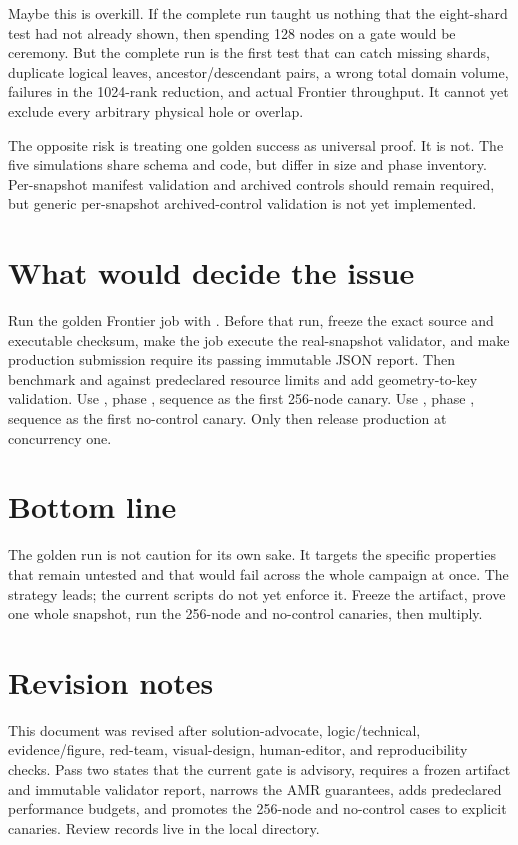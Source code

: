 \documentclass[11pt]{article}
\begin{document}
Maybe this is overkill. If the complete run taught us nothing that the
eight-shard test had not already shown, then spending 128 nodes on a gate would
be ceremony. But the complete run is the first test that can catch missing
shards, duplicate logical leaves, ancestor/descendant pairs, a wrong total
domain volume, failures in the 1024-rank reduction, and actual Frontier
throughput. It cannot yet exclude every arbitrary physical hole or overlap.

The opposite risk is treating one golden success as universal proof. It is not.
The five simulations share schema and code, but differ in size and phase
inventory. Per-snapshot manifest validation and archived controls should remain
required, but generic per-snapshot archived-control validation is not yet
implemented.

\section{What would decide the issue}

Run the golden Frontier job with . Before that run,
freeze the exact source and executable checksum, make the job execute the
real-snapshot validator, and make production submission require its passing
immutable JSON report. Then benchmark  and 
against predeclared resource limits and add geometry-to-key validation. Use
, phase , sequence  as the
first 256-node canary. Use , phase
, sequence  as the first no-control
canary. Only then release production at concurrency one.

\section{Bottom line}

\bottomline The golden run is not caution for its own sake. It targets the
specific properties that remain untested and that would fail across the whole
campaign at once. The strategy leads; the current scripts do not yet enforce
it. Freeze the artifact, prove one whole snapshot, run the 256-node and
no-control canaries, then multiply.

\appendix
\section{Revision notes}
This document was revised after solution-advocate, logic/technical,
evidence/figure, red-team, visual-design, human-editor, and reproducibility
checks. Pass two states that the current gate is advisory, requires a frozen
artifact and immutable validator report, narrows the AMR guarantees, adds
predeclared performance budgets, and promotes the 256-node and no-control
cases to explicit canaries. Review records live in the local 
directory.
\end{document}

